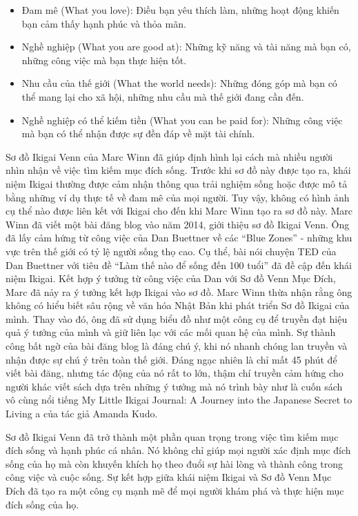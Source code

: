 \begin{itemize}
    \item Đam mê (What you love): Điều bạn yêu thích làm, những hoạt động khiến bạn cảm thấy hạnh phúc và thỏa mãn.
    \item Nghề nghiệp (What you are good at): Những kỹ năng và tài năng mà bạn có, những công việc mà bạn thực hiện tốt.
    \item Nhu cầu của thế giới (What the world needs): Những đóng góp mà bạn có thể mang lại cho xã hội, những nhu cầu mà thế giới đang cần đến.
    \item Nghề nghiệp có thể kiếm tiền (What you can be paid for): Những công việc mà bạn có thể nhận được sự đền đáp về mặt tài chính. 
\end{itemize}

Sơ đồ Ikigai Venn của Marc Winn đã giúp định hình lại cách mà nhiều người nhìn nhận về việc tìm kiếm mục đích sống. Trước khi sơ đồ này được tạo ra, khái niệm Ikigai thường được cảm nhận thông qua trải nghiệm sống hoặc được mô tả bằng những ví dụ thực tế về đam mê của mọi người. Tuy vậy, không có hình ảnh cụ thể nào được liên kết với Ikigai cho đến khi Marc Winn tạo ra sơ đồ này. Marc Winn đã viết một bài đăng blog vào năm 2014, giới thiệu sơ đồ Ikigai Venn\cite{theviewinsideme}. Ông đã lấy cảm hứng từ công việc của Dan Buettner về các “Blue Zones” - những khu vực trên thế giới có tỷ lệ người sống thọ cao. Cụ thể, bài nói chuyện TED của Dan Buettner với tiêu đề “Làm thế nào để sống đến 100 tuổi” đã đề cập đến khái niệm Ikigai. Kết hợp ý tưởng từ công việc của Dan với Sơ đồ Venn Mục Đích, Marc đã nảy ra ý tưởng kết hợp Ikigai vào sơ đồ. Marc Winn thừa nhận rằng ông không có hiểu biết sâu rộng về văn hóa Nhật Bản khi phát triển Sơ đồ Ikigai của mình. Thay vào đó, ông đã sử dụng biểu đồ như một công cụ để truyền đạt hiệu quả ý tưởng của mình và giữ liên lạc với các mối quan hệ của mình. Sự thành công bất ngờ của bài đăng blog là đáng chú ý, khi nó nhanh chóng lan truyền và nhận được sự chú ý trên toàn thế giới. Đáng ngạc nhiên là chỉ mất 45 phút để viết bài đăng, nhưng tác động của nó rất to lớn, thậm chí truyền cảm hứng cho người khác viết sách dựa trên những ý tưởng mà nó trình bày như là cuốn sách vô cùng nổi tiếng My Little Ikigai Journal: A Journey into the Japanese Secret to Living a của tác giả Amanda Kudo.

Sơ đồ Ikigai Venn đã trở thành một phần quan trọng trong việc tìm kiếm mục đích sống và hạnh phúc cá nhân. Nó không chỉ giúp mọi người xác định mục đích sống của họ mà còn khuyến khích họ theo đuổi sự hài lòng và thành công trong công việc và cuộc sống. Sự kết hợp giữa khái niệm Ikigai và Sơ đồ Venn Mục Đích đã tạo ra một công cụ mạnh mẽ để mọi người khám phá và thực hiện mục đích sống của họ.

